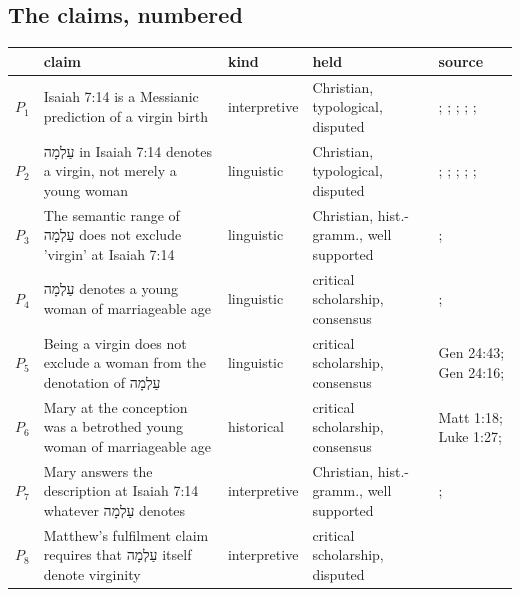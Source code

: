 \documentclass[11pt]{article}
\begin{document}
\subsection*{The claims, numbered}
\begin{longtable}{@{}r >{\raggedright\arraybackslash}p{} l >{\raggedright\arraybackslash}p{} >{\raggedright\arraybackslash}p{}@{}}
\toprule
 & claim & kind & held & source \\
\midrule
\endhead
$P_{1}$ & Isaiah 7:14 is a Messianic prediction of a virgin birth & interpretive & Christian, typological, disputed & \cite[ad loc. Isa 7:14]{motyer-isaiah-1993}; \cite[123]{motyer-context-content-1970}; \cite[12--14]{compton-immanuel-prophecy-2007}; \cite[66]{justin-dialogue-with-trypho-160}; \cite[III.21.6]{irenaeus-against-heresies-180}; \cite[I.35]{origen-against-celsus-248} \\
$P_{2}$ & עַלְמָה in Isaiah 7:14 denotes a virgin, not merely a young woman & linguistic & Christian, typological, disputed & \cite[ad loc. Isa 7:14]{motyer-isaiah-1993}; \cite[app. Isa 7:14]{bhs-1997}; \cite[1653--1654]{berry-virgin-birth-2003}; \cite[125]{motyer-context-content-1970}; \cite[7--8]{compton-immanuel-prophecy-2007}; \cite[I.32]{jerome-against-jovinianus-393} \\
$P_{3}$ & The semantic range of עַלְמָה does not exclude 'virgin' at Isaiah 7:14 & linguistic & Christian, hist.-gramm., well supported & \cite[1653--1654]{berry-virgin-birth-2003}; \cite[120--124]{young-immanuel-prophecy-1953} \\
$P_{4}$ & עַלְמָה denotes a young woman of marriageable age & linguistic & critical scholarship, consensus & \cite{rico-gentry-infant-king-2020}; \cite{wegner-virgin-births-2011} \\
$P_{5}$ & Being a virgin does not exclude a woman from the denotation of עַלְמָה & linguistic & critical scholarship, consensus & Gen 24:43; Gen 24:16; \cite{rico-gentry-infant-king-2020} \\
$P_{6}$ & Mary at the conception was a betrothed young woman of marriageable age & historical & critical scholarship, consensus & Matt 1:18; Luke 1:27; \cite[ad loc. Matt 1:23]{france-matthew-2007} \\
$P_{7}$ & Mary answers the description at Isaiah 7:14 whatever עַלְמָה denotes & interpretive & Christian, hist.-gramm., well supported & \cite[ad loc. Matt 1:23]{france-matthew-2007}; \cite{rico-gentry-infant-king-2020} \\
$P_{8}$ & Matthew's fulfilment claim requires that עַלְמָה itself denote virginity & interpretive & critical scholarship, disputed & \cite{brown-birth-messiah-1993} \\

\end{longtable}
\end{document}

